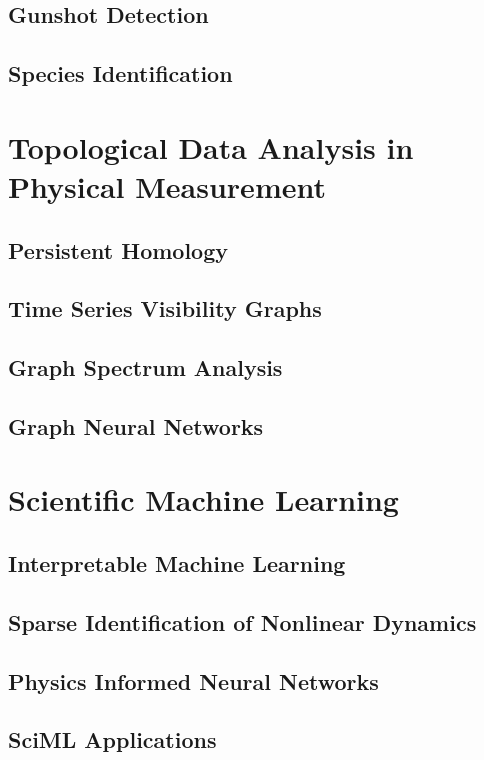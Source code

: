 \documentclass[doublespacing]{utdthesis}
\begin{document}
\section{Gunshot Detection}
\label{s:guns}
\section{Species Identification}
\label{s:birds}

\chapter{Topological Data Analysis in Physical Measurement}
\label{c:tda}
\section{Persistent Homology}
\label{s:homology}
\section{Time Series Visibility Graphs}
\label{s:visibility}
\section{Graph Spectrum Analysis}
\label{s:spectrum}
\section{Graph Neural Networks}
\label{s:gnn}

\chapter{Scientific Machine Learning}
\label{c:sciml}
\section{Interpretable Machine Learning }
\label{s:interpretable}
\section{Sparse Identification of Nonlinear Dynamics}
\label{s:sindy}
\section{Physics Informed Neural Networks}
\label{s:pinn}
\section{SciML Applications}
\label{s:sciml applications}
\end{document}
